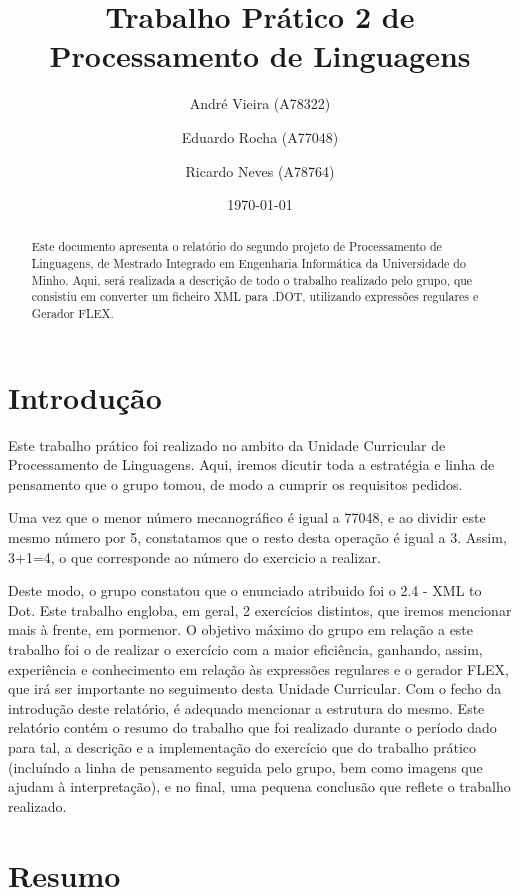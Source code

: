 \documentclass[a4paper]{article}
\title{Trabalho Prático 2 de Processamento de Linguagens}
\author{André Vieira (A78322) \and Eduardo Rocha (A77048) \and Ricardo Neves (A78764)}
\date{\today}
\begin{document}
\maketitle

\begin{abstract}
  Este documento apresenta o relatório do segundo projeto de Processamento de Linguagens, 
  de Mestrado Integrado em Engenharia Informática da Universidade do Minho.
  Aqui, será realizada a descrição de todo o trabalho realizado pelo grupo, que
  consistiu em converter um ficheiro XML para .DOT, utilizando expressões 
  regulares e Gerador FLEX.

\end{abstract}

\tableofcontents

\section{Introdução}
\label{sec:intro}

Este trabalho prático foi realizado no ambito da Unidade Curricular de Processamento de Linguagens.
Aqui, iremos dicutir toda a estratégia e linha de pensamento que o grupo tomou, de modo a cumprir os requisitos pedidos.

Uma vez que o menor número mecanográfico é igual a 77048, e ao dividir este mesmo número por 5, constatamos que o resto desta operação é igual a 3. Assim, 3+1=4, o que corresponde ao número do exercicio a realizar.

Deste modo, o grupo constatou que o enunciado atribuido foi o 2.4 - XML to Dot.
Este trabalho engloba, em geral, 2 exercícios distintos, que iremos mencionar mais à frente, em pormenor.
O objetivo máximo do grupo em relação a este trabalho foi o de realizar o exercício com a maior eficiência, ganhando, assim, experiência e conhecimento em relação às expressões regulares e o gerador FLEX, que irá ser importante no seguimento desta Unidade Curricular. 
Com o fecho da introdução deste relatório, é adequado mencionar a estrutura do mesmo. Este relatório contém o resumo do trabalho que foi realizado durante o período dado para tal, a descrição e a implementação do exercício que do trabalho prático (incluíndo a linha de pensamento seguida pelo grupo, bem como imagens que ajudam à interpretação), e no final, uma pequena conclusão que reflete o trabalho realizado.

\section{Resumo}
\label{sec:resumo}
\end{document}
